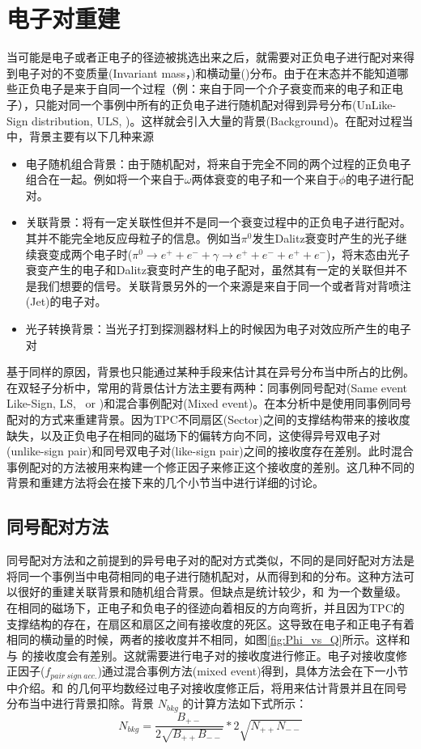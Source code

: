 \section{电子对重建}

当可能是电子或者正电子的径迹被挑选出来之后，就需要对正负电子进行配对来得到电子对的不变质量(Invariant mass，\Mee)和横动量(\pt)分布。由于在末态并不能知道哪些正负电子是来于自同一个过程（例：来自于同一个介子衰变而来的电子和正电子），只能对同一个事例中所有的正负电子进行随机配对得到异号分布(UnLike-Sign distribution, ULS, \Npm)。这样就会引入大量的背景(Background)。在配对过程当中，背景主要有以下几种来源
\begin{itemize}
  \item 电子随机组合背景：由于随机配对，将来自于完全不同的两个过程的正负电子组合在一起。例如将一个来自于$\omega$两体衰变的电子和一个来自于$\phi$的电子进行配对。
  \item 关联背景：将有一定关联性但并不是同一个衰变过程中的正负电子进行配对。其并不能完全地反应母粒子的信息。例如当$\pi^0$发生Dalitz衰变时产生的光子继续衰变成两个电子时($\pi^0\rightarrow e^+ + e^- + \gamma \rightarrow e^+ + e^- + e^+ + e^- $)，将末态由光子衰变产生的电子和Dalitz衰变时产生的电子配对，虽然其有一定的关联但并不是我们想要的信号。关联背景另外的一个来源是来自于同一个或者背对背喷注(Jet)的电子对。
  \item 光子转换背景：当光子打到探测器材料上的时候因为电子对效应所产生的电子对
\end{itemize}

基于同样的原因，背景也只能通过某种手段来估计其在异号分布当中所占的比例。在双轻子分析中，常用的背景估计方法主要有两种：同事例同号配对(Same event Like-Sign, LS, \Npp~or \Nmm)和混合事例配对(Mixed event)。在本分析中是使用同事例同号配对的方式来重建背景。因为TPC不同扇区(Sector)之间的支撑结构带来的接收度缺失，以及正负电子在相同的磁场下的偏转方向不同，这使得异号双电子对(unlike-sign pair)和同号双电子对(like-sign pair)之间的接收度存在差别。此时混合事例配对的方法被用来构建一个修正因子来修正这个接收度的差别。这几种不同的背景和重建方法将会在接下来的几个小节当中进行详细的讨论。

\subsection{同号配对方法}
同号配对方法和之前提到的异号电子对的配对方式类似，不同的是同好配对方法是将同一个事例当中电荷相同的电子进行随机配对，从而得到\Npp 和\Nmm 的分布。这种方法可以很好的重建关联背景和随机组合背景。但缺点是统计较少，和 \Npm 为一个数量级。在相同的磁场下，正电子和负电子的径迹向着相反的方向弯折，并且因为TPC的支撑结构的存在，在扇区和扇区之间有接收度的死区。这导致在电子和正电子有着相同的横动量的时候，两者的接收度并不相同，如图\ref{fig:Phi_vs_Q}所示。这样\Nmm 和 \Npp 与 \Npm 的接收度会有差别。这就需要进行电子对的接收度进行修正。电子对接收度修正因子($f_{pair~sign~acc.}$)通过混合事例方法(mixed event)得到，具体方法会在下一小节中介绍。\Npp 和 \Nmm 的几何平均数经过电子对接收度修正后，将用来估计背景并且在同号分布当中进行背景扣除。背景 $N_{bkg}$ 的计算方法如下式所示：
\begin{equation}
    N_{bkg} = \frac{B_{+-}}{2\sqrt{B_{++}B_{--}}}*2\sqrt{N_{++}N_{--}}
\end{equation}

